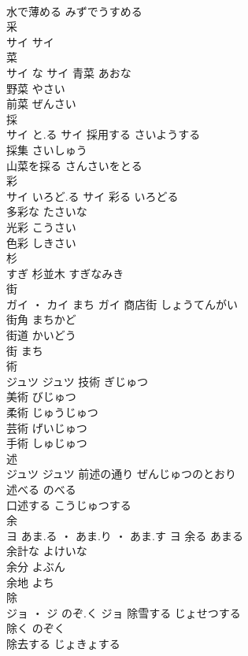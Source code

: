 \documentclass[8pt]{extreport}
\begin{document}
\begin{CJK}{UTF8}{min}
\\	水で薄める	みずでうすめる	
\\	采	
\\	サイ		サイ																																			
\\	菜	
\\	サイ	な	サイ	青菜	あおな	
\\	野菜	やさい	
\\	前菜	ぜんさい	
\\	採	
\\	サイ	と.る	サイ	採用する	さいようする	
\\	採集	さいしゅう	
\\	山菜を採る	さんさいをとる	
\\	彩	
\\	サイ	いろど.る	サイ	彩る	いろどる	
\\	多彩な	たさいな	
\\	光彩	こうさい	
\\	色彩	しきさい	
\\	杉	
\\	すぎ														杉並木	すぎなみき	
\\	街	
\\	ガイ ・ カイ	まち	ガイ	商店街	しょうてんがい	
\\	街角	まちかど	
\\	街道	かいどう	
\\	街	まち	
\\	術	
\\	ジュツ		ジュツ	技術	ぎじゅつ	
\\	美術	びじゅつ	
\\	柔術	じゅうじゅつ	
\\	芸術	げいじゅつ	
\\	手術	しゅじゅつ	
\\	述	
\\	ジュツ		ジュツ	前述の通り	ぜんじゅつのとおり	
\\	述べる	のべる	
\\	口述する	こうじゅつする	
\\	余	
\\	ヨ	あま.る ・ あま.り ・ あま.す	ヨ	余る	あまる	
\\	余計な	よけいな	
\\	余分	よぶん	
\\	余地	よち	
\\	除	
\\	ジョ ・ ジ	のぞ.く	ジョ	除雪する	じょせつする	
\\	除く	のぞく	
\\	除去する	じょきょする	

\end{CJK}
\end{document}
